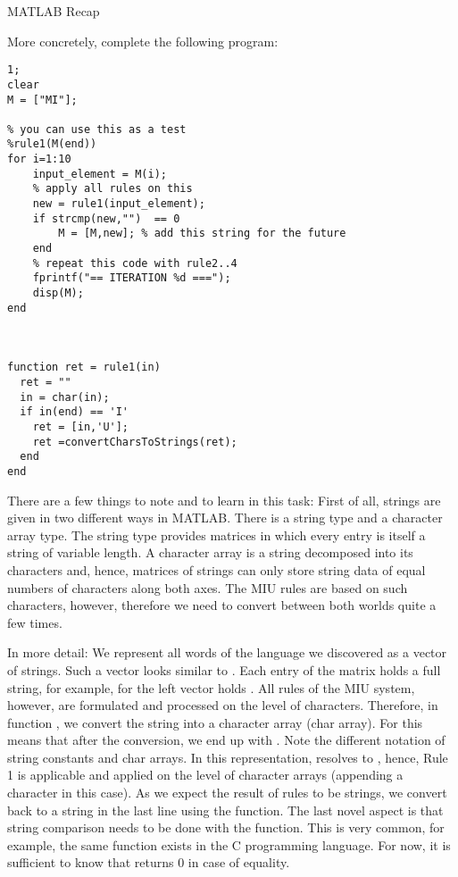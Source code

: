 \begin{task}{MATLAB Recap}{}{}
\begin{enumerate}
{    More concretely, complete the following program:
\begin{lstlisting}
1;
clear
M = ["MI"];

% you can use this as a test
%rule1(M(end))
for i=1:10
    input_element = M(i);
    % apply all rules on this
    new = rule1(input_element);
    if strcmp(new,"")  == 0
        M = [M,new]; % add this string for the future
    end
    % repeat this code with rule2..4
    fprintf("== ITERATION %d ===");
    disp(M);
end



function ret = rule1(in)
  ret = ""
  in = char(in);
  if in(end) == 'I'
    ret = [in,'U'];
    ret =convertCharsToStrings(ret);
  end
end

\end{lstlisting}

There are a few things to note and to learn in this task: First of all, strings are given in two
different ways in MATLAB. There is a string type and a character array type. The string type provides
matrices in which every entry is itself a string of variable length. A character array is a string decomposed into its characters and, hence, matrices of strings can only store string data of equal numbers of characters along both axes. The MIU rules are based on such characters, however, therefore we need to convert between both worlds quite a few times.

In more detail: We represent all words of the language we discovered as a vector of strings. Such a vector looks similar to . Each entry of the matrix holds a full string, for example, for the left vector  holds . All rules of the MIU system, however, are formulated and processed on the level of characters. Therefore, in function , we convert the string into a character array (char array). For  this means that after the conversion, we end up with
. Note the different notation of string constants and char arrays. In this representation,  resolves to , hence, Rule 1 is applicable and applied on the level of character arrays (appending a character in this case). As we expect the result of rules to be strings, we convert back to a string in the last line using the  function.
The last novel aspect is that string comparison needs to be done with the  function. This is very common, for example, the same function exists in the C programming language. For now, it is sufficient to know that  returns 0 in case of equality. 
  }
    

\end{enumerate}
\end{task}
